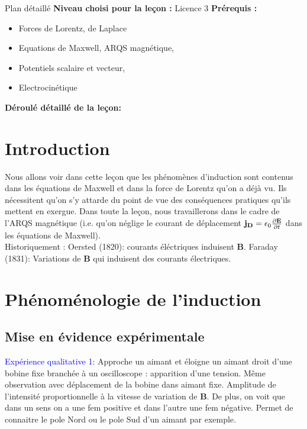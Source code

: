 \begin{reportBlock}{Plan détaillé}
  \textbf{Niveau choisi pour la leçon :} Licence 3
  \newline
  \textbf{Prérequis : }
  \begin{itemize}
    \item Forces de Lorentz, de Laplace 
    \item Equations de Maxwell, ARQS magnétique,
    \item Potentiels scalaire et vecteur,
    \item Electrocinétique
  \end{itemize} 
  
  \textbf{Déroulé détaillé de la leçon: }\newline
  \section*{Introduction} 
  Nous allons voir dans cette leçon que les phénomènes d'induction sont contenus dans les équations de Maxwell et dans la force de Lorentz qu'on a déjà vu. Ils nécessitent qu'on s'y attarde du point de vue des conséquences pratiques qu'ils mettent en exergue. Dans toute la leçon, nous travaillerons dans le cadre de l'ARQS magnétique (i.e. qu'on néglige le courant de déplacement $\mathbf{j_D}=\epsilon_0\frac{\partial \mathbf{E}}{\partial t}$ dans les équations de Maxwell).\\
  
  Historiquement : Oersted (1820): courants éléctriques induisent $\mathbf B$. Faraday (1831): Variations de $\mathbf B$ qui induisent des courants électriques. 
 
  \section{Phénoménologie de l'induction}
  \subsection{Mise en évidence expérimentale}
  
  \textcolor{blue}{Expérience qualitative 1:} Approche un aimant et éloigne un aimant droit d'une bobine fixe branchée à un oscilloscope : apparition d'une tension. Même observation avec déplacement de la bobine dans aimant fixe. Amplitude de l'intensité proportionnelle à la vitesse de variation de $\mathbf B$. De plus, on voit que dans un sens on a une fem positive et dans l'autre une fem négative. Permet de connaitre le pole Nord ou le pole Sud d'un aimant par exemple.\\
  

\end{reportBlock}
